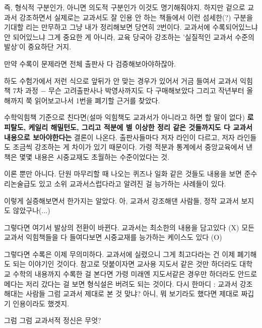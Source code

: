 즉, 형식적 구분인가, 아니면 의도적 구분인가 이것도 명기해줘야지.
하지만 겉으로 교과서 강조하면서 실제로는 교과서도 잘 인용 안 하는 책들에서 이런 섬세한(?) 구분을 기대할 리는 만무하고
그냥 내가 정리해보면 당연히 2번이다.
교과서에 수록되어있느냐 안 되어있느냐 그게 중요한 게 아니라, 교육 당국아 강조하는 '실질적인 교과서 수준의 발상'이 중요하단 거지.
\vspace{5mm}

만약 수록이 문제라면 전체 출판사 다 검증해보아야하잖아.
\vspace{5mm}

하도 수험가에서 저런 식으로 앞뒤가 안 맞는 경우가 있어서 거금 들여서 교과서 익힘책 7차 과정 $-$ 무슨 고려출판사나 박영사까지도 다 구매해보았다
그리고 작년부터 올해까지 쭉 읽어보고나서 1번을 폐기할 근거를 찾았다.
\vspace{5mm}

수학익힘책 기준으로 친다면(설마 익힘책도 교과서가 아니라고 하면 할 말이 없다)
\textbf{로피탈도, 케일리 해밀턴도, 그리고 적분에 별 이상한 정리 같은 것들까지도 다 교과서 내용으로 보아야한다는} 결론이 나온다.
출판사들마다 저자 라인이 다르고, 저자 라인들도 조금씩 강조하는 게 차이가 있기 때문이다.
가령 적분과 통계에서 중앙교육에서 낸 책은 몇몇 내용은 시중교재도 초월하는 수준이었다는 것.
\vspace{5mm}

이론 뿐만 아니다. 단원 마무리할 때 나오는 퀴즈나 일화 같은 것들도 내용을 보면 준수리논술급도 있고
소위 교과서스럽다라고 알려진 걸 능가하는 사례들이 있다.
\vspace{5mm}

이렇게 실증해보면서 한가지는 알았다. 아, 교과서 강조해댄 사람들, 정작 교과서 보지도 않았구나(...)
\vspace{5mm}

그렇다면 여기서 발상의 전환이 바뀐다.
교과서는 최소한의 내용을 담고있다 (X)
모든 교과서 익힘책들을 다 들여다보면 시중교재를 능가하는 케이스도 있다 (O)
\vspace{5mm}

그렇다면 수록은 이제 무의미하다. 교과서에 실렸으니 그게 최고다라는 건 이제 폐기해도 되는 이야기인 것이다.
참고로 덧붙이자면 교사용 지도서 같은 것만 하더라도 대학교 수학의 내용까지 수록한 걸 본다면
가령 미래엔 지도서같은 경우만 하더라도 안드로메다는 저리 갔다는 걸 보면 형식설은 버려도 되는 것이다.
다시 한마디 : 교과서 강조해대는 사람들 그럼 교과서 제대로 본 것 맞냐? 아니, 뭐 보기라도 했다면 제대로 짜깁기 인용이라도 했겟지.
\vspace{5mm}

그럼  그럼 교과서적 정신은 무엇?
\vspace{5mm}

